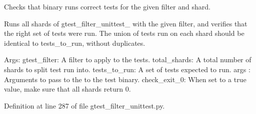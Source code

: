 \begin{DoxyVerb}Checks that binary runs correct tests for the given filter and shard.

Runs all shards of gtest_filter_unittest_ with the given filter, and
verifies that the right set of tests were run. The union of tests run
on each shard should be identical to tests_to_run, without duplicates.

Args:
  gtest_filter: A filter to apply to the tests.
  total_shards: A total number of shards to split test run into.
  tests_to_run: A set of tests expected to run.
  args   :      Arguments to pass to the to the test binary.
  check_exit_0: When set to a true value, make sure that all shards
            return 0.
\end{DoxyVerb}
 

\-Definition at line 287 of file gtest\-\_\-filter\-\_\-unittest.\-py.


